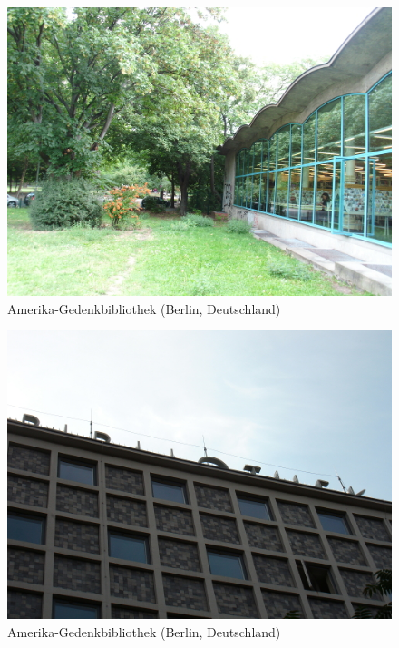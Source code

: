 \documentclass[a4paper,
fontsize=11pt,
oneside,
numbers=noperiodatend,
parskip=half-,
bibliography=totoc,
final
]{scrartcl}
\begin{document}
\begin{figure}[htbp]
\centering
\includegraphics{./img/025.jpg}
\caption{Amerika-Gedenkbibliothek (Berlin,
Deutschland)}
\end{figure}

\begin{figure}[htbp]
\centering
\includegraphics{./img/026.jpg}
\caption{Amerika-Gedenkbibliothek (Berlin,
Deutschland)}
\end{figure}
\end{document}
